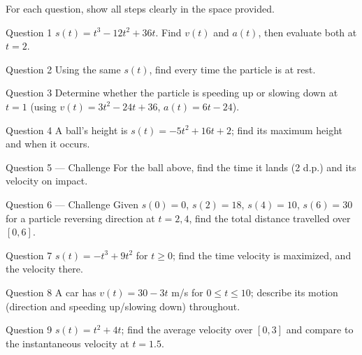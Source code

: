 \documentclass[11pt]{article}
\begin{document}
\clearpage
{}
For each question, show all steps clearly in the space provided.

\begin{qbox}{Question 1}
$s(t)=t^3-12t^2+36t$. Find $v(t)$ and $a(t)$, then evaluate both at $t=2$.\workspace{2.4cm}
\end{qbox}

\begin{qbox}{Question 2}
Using the same $s(t)$, find every time the particle is at rest.\workspace{2.4cm}
\end{qbox}

\begin{qbox}{Question 3}
Determine whether the particle is speeding up or slowing down at $t=1$ (using $v(t)=3t^2-24t+36$, $a(t)=6t-24$).\workspace{2.4cm}
\end{qbox}

\begin{qbox}{Question 4}
A ball's height is $s(t)=-5t^2+16t+2$; find its maximum height and when it occurs.\workspace{2.4cm}
\end{qbox}

\begin{qbox}{Question 5 --- Challenge}
For the ball above, find the time it lands (2 d.p.) and its velocity on impact.\workspace{3.4cm}
\end{qbox}

\begin{qbox}{Question 6 --- Challenge}
Given $s(0)=0$, $s(2)=18$, $s(4)=10$, $s(6)=30$ for a particle reversing direction at $t=2,4$, find the total distance travelled over $[0,6]$.\workspace{3.2cm}
\end{qbox}

\begin{qbox}{Question 7}
$s(t)=-t^3+9t^2$ for $t\geq0$; find the time velocity is maximized, and the velocity there.\workspace{2.4cm}
\end{qbox}

\begin{qbox}{Question 8}
A car has $v(t)=30-3t$ m/s for $0\leq t\leq10$; describe its motion (direction and speeding up/slowing down) throughout.\workspace{2.4cm}
\end{qbox}

\begin{qbox}{Question 9}
$s(t)=t^2+4t$; find the average velocity over $[0,3]$ and compare to the instantaneous velocity at $t=1.5$.\workspace{2.4cm}
\end{qbox}
\end{document}
